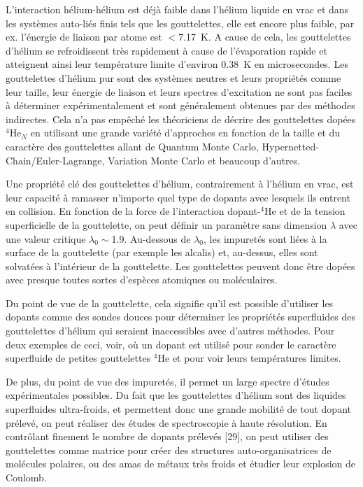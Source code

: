 		L'interaction hélium-hélium est déjà faible dans l'hélium liquide en vrac et dans les systèmes auto-liés finis tels que les gouttelettes, elle est encore plus faible, par ex. l'énergie de liaison par atome est $<$7.17~K. A cause de cela, les gouttelettes d'hélium se refroidissent très rapidement à cause de l'évaporation rapide et atteignent ainsi leur température limite d'environ 0.38~K en microsecondes. Les gouttelettes d'hélium pur sont des systèmes neutres et leurs propriétés comme leur taille, leur énergie de liaison et leurs spectres d'excitation ne sont pas faciles à déterminer expérimentalement et sont généralement obtenues par des méthodes indirectes. Cela n'a pas empêché les théoriciens de décrire des gouttelettes dopées $^4$He$_N$ en utilisant une grande variété d'approches en fonction de la taille et du caractère des gouttelettes allant de Quantum Monte Carlo, Hypernetted-Chain/Euler-Lagrange\citep{Krotscheck2001}, Variation Monte Carlo\citep{Gartner2018} et beaucoup d'autres.

		Une propriété clé des gouttelettes d'hélium, contrairement à l'hélium en vrac, est leur capacité à ramasser n'importe quel type de dopants avec lesquels ils entrent en collision. En fonction de la force de l'interaction dopant-$^4$He et de la tension superficielle de la gouttelette, on peut définir un paramètre sans dimension $\lambda$\citep{Anc95} avec une valeur critique $\lambda_0\!\!\sim$1.9. Au-dessous de $\lambda_0$, les impuretés sont liées à la surface de la gouttelette (par exemple les alcalis) et, au-dessus, elles sont solvatées à l'intérieur de la gouttelette. Les gouttelettes peuvent donc être dopées avec presque toutes sortes d'espèces atomiques ou moléculaires.

		Du point de vue de la gouttelette, cela signifie qu'il est possible d'utiliser les dopants comme des sondes douces pour déterminer les propriétés superfluides des gouttelettes d'hélium qui seraient inaccessibles avec d'autres méthodes. Pour deux exemples de ceci, voir, où un dopant est utilisé pour sonder le caractère superfluide de petites gouttelettes $^4$He et pour voir leurs températures limites.
		
		De plus, du point de vue des impuretés, il permet un large spectre d'études expérimentales possibles. Du fait que les gouttelettes d'hélium sont des liquides superfluides ultra-froids, et permettent donc une grande mobilité de tout dopant prélevé, on peut réaliser des études de spectroscopie à haute résolution. En contrôlant finement le nombre de dopants prélevés [29], on peut utiliser des gouttelettes comme matrice pour créer des structures auto-organisatrices de molécules polaires, ou des amas de métaux très froids et étudier leur explosion de Coulomb.

